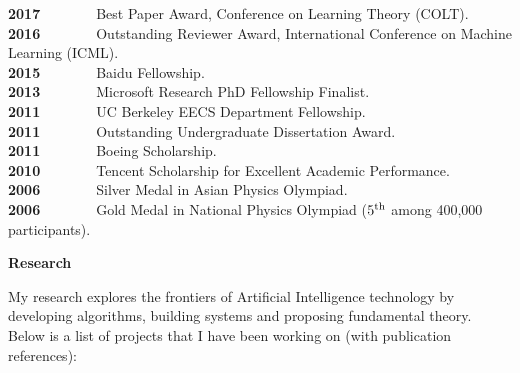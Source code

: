 \documentclass{res} %
\begin{document}
\begin{resume}
\vspace{-5pt}
\textbf{2017}~~~~~~~~Best Paper Award, Conference on Learning Theory (COLT).\\
\textbf{2016}~~~~~~~~Outstanding Reviewer Award, International Conference on Machine Learning (ICML).\\
\textbf{2015}~~~~~~~~Baidu Fellowship.\\
\textbf{2013}~~~~~~~~Microsoft Research PhD Fellowship Finalist.\\
\textbf{2011}~~~~~~~~UC Berkeley EECS Department Fellowship.\\
\textbf{2011}~~~~~~~~Outstanding Undergraduate Dissertation Award.\\
\textbf{2011}~~~~~~~~Boeing Scholarship.\\
\textbf{2010}~~~~~~~~Tencent Scholarship for Excellent Academic Performance.\\
\textbf{2006}~~~~~~~~Silver Medal in Asian Physics Olympiad.\\
\textbf{2006}~~~~~~~~Gold Medal in National Physics Olympiad ($5^{\rm{th}}$ among 400,000 participants).

{\bf\Large Research}

My research explores the frontiers of Artificial Intelligence technology by developing algorithms, building systems and proposing fundamental theory. Below is a list of projects that I have been working on (with publication references):


\end{resume}
\end{document}

